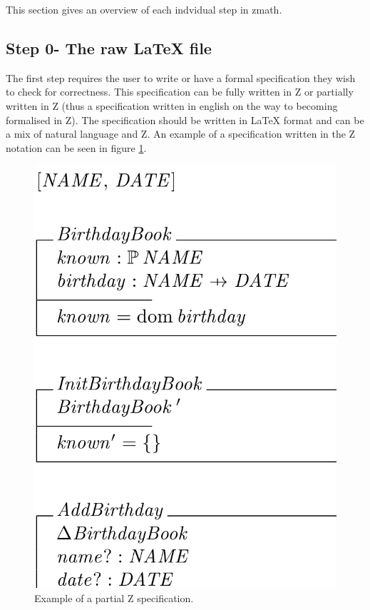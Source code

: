 This section gives an overview of each indvidual step in \gls{zmath}.

\subsection{Step 0- The raw LaTeX file}

The first step requires the user to write or have a formal specification they wish to check for correctness. This specification can be fully written in Z or partially written in Z (thus a specification written in english on the way to becoming formalised in Z). The specification should be written in \LaTeX{} format and can be a mix of natural language and Z. An example of a specification written in the Z notation can be seen in figure \ref{fig:zexample}.

\begin{figure}[H]
 \begin{center}
 \includegraphics [scale=0.25]{Figures/Design/zspec.png}
 \caption{Example of a partial Z specification.}
 \label{fig:zexample}
\end{center}
\end{figure} 

